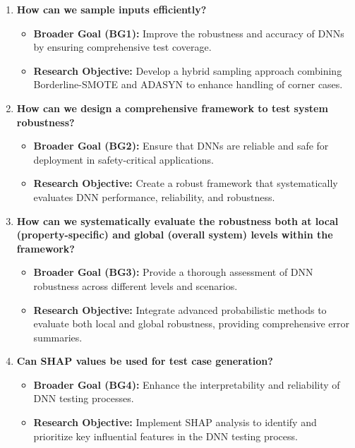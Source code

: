 \begin{enumerate}
    \item \textbf{How can we sample inputs efficiently?}
        \begin{itemize}
            \item \textbf{Broader Goal (BG1):} Improve the robustness and accuracy of DNNs by ensuring comprehensive test coverage.
            \item \textbf{Research Objective:} Develop a hybrid sampling approach combining Borderline-SMOTE and ADASYN to enhance handling of corner cases.
        \end{itemize}
    
    \item \textbf{How can we design a comprehensive framework to test system robustness?}
        \begin{itemize}
            \item \textbf{Broader Goal (BG2):} Ensure that DNNs are reliable and safe for deployment in safety-critical applications.
            \item \textbf{Research Objective:} Create a robust framework that systematically evaluates DNN performance, reliability, and robustness.
        \end{itemize}
    
    \item \textbf{How can we systematically evaluate the robustness both at local (property-specific) and global (overall system) levels within the framework?}
        \begin{itemize}
            \item \textbf{Broader Goal (BG3):} Provide a thorough assessment of DNN robustness across different levels and scenarios.
            \item \textbf{Research Objective:} Integrate advanced probabilistic methods to evaluate both local and global robustness, providing comprehensive error summaries.
        \end{itemize}
    
    \item \textbf{Can SHAP values be used for test case generation?}
        \begin{itemize}
            \item \textbf{Broader Goal (BG4):} Enhance the interpretability and reliability of DNN testing processes.
            \item \textbf{Research Objective:} Implement SHAP analysis to identify and prioritize key influential features in the DNN testing process.
        \end{itemize}
    

\end{enumerate}
